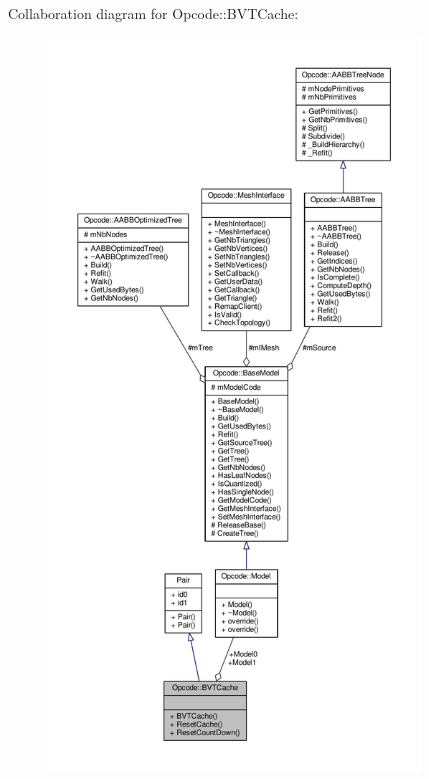 Collaboration diagram for Opcode\+:\+:B\+V\+T\+Cache\+:
\nopagebreak
\begin{figure}[H]
\begin{center}
\leavevmode
\includegraphics[height=550pt]{d3/d58/structOpcode_1_1BVTCache__coll__graph}
\end{center}
\end{figure}
